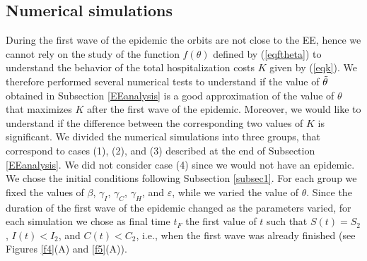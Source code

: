 \documentclass[11pt,reqno]{amsart}
\theoremstyle{boldremark}
\begin{document}
\subsection{Numerical simulations}

\noindent During the first wave of the epidemic the orbits are not close to the EE, hence we cannot rely on the study of the function $f(\theta)$ defined by (\ref{eqftheta}) to understand the behavior of the total hospitalization costs $K$ given by (\ref{eqk}). We therefore performed several numerical tests to understand if the value of $\Tilde{\theta}$ obtained in Subsection \ref{EEanalysis} is a good approximation of the value of $\theta$ that maximizes $K$ after the first wave of the epidemic. Moreover, we would like to understand if the difference between the corresponding two values of $K$ is significant. We divided the numerical simulations into three groups, that correspond to cases (1), (2), and (3) described at the end of Subsection \ref{EEanalysis}. We did not consider case (4) since we would not have an epidemic. We chose the initial conditions following Subsection \ref{subsec1}. For each group we fixed the values of $\beta$, $\gamma_I$, $\gamma_C$, $\gamma_H$, and $\varepsilon$, while we varied the value of $\theta$. Since the duration of the first wave of the epidemic changed as the parameters varied, for each simulation we chose as final time $t_F$ the first value of $t$ such that $S(t)=S_2$, $I(t)<I_2$, and $C(t)<C_2$, i.e., when the first wave was already finished (see Figures \ref{f4}(A) and \ref{f5}(A)). 
\end{document}
